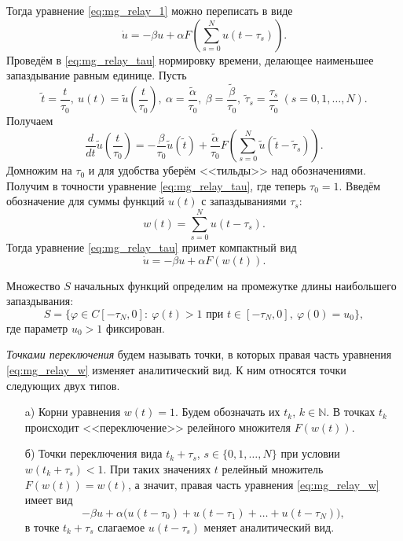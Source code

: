 Тогда уравнение \eqref{eq:mg_relay_1} можно переписать в виде
\begin{equation}
	\label{eq:mg_relay_tau}
	\dot{u}=-\beta u+\alpha F\left(\sum_{s=0}^{N}u(t-\tau_s)\right).
\end{equation}
%
Проведём в \eqref{eq:mg_relay_tau} нормировку времени, делающее наименьшее запаздывание равным единице. Пусть
%
\begin{equation*}
	\tilde{t} = \frac{t}{\tau_0}, \ u(t) = \tilde{u}\left(\frac{t}{\tau_0}\right), \ \alpha = \frac{\tilde{\alpha}}{\tau_0}, \ \beta = \frac{\tilde{\beta}}{\tau_0}, \ \tilde{\tau}_s = \frac{\tau_s}{\tau_0} \ (s = 0, 1, \ldots, N).
\end{equation*}
%
Получаем
%
\begin{equation*}
	\frac{d}{dt} \tilde{u}\left(\frac{t}{\tau_0}\right) = -\frac{\beta}{\tau_0} \tilde{u}(\tilde{t}) + \frac{\tilde{\alpha}}{\tau_0} F \left(\sum_{s=0}^{N}\tilde{u}(\tilde{t}-\tilde{\tau}_s)\right).
\end{equation*}
%
Домножим на $\tau_0$ и для удобства уберём <<тильды>> над обозначениями. Получим в точности уравнение \eqref{eq:mg_relay_tau}, где теперь $\tau_0 = 1$.
%
Введём обозначение для суммы функций $u(t)$ с запаздываниями $\tau_s$:
%
\begin{equation*}
	w(t) = \sum\limits_{s = 0}^N u(t - \tau_s).
\end{equation*}
%
Тогда уравнение \eqref{eq:mg_relay_tau} примет компактный вид
%
\begin{equation}
	\label{eq:mg_relay_w}
	\dot{u}=-\beta u + \alpha F(w(t)).
\end{equation}

Множество $S$ начальных функций определим на промежутке длины наибольшего запаздывания: 
%
\begin{equation}
	\label{eq:mg_init_set}
	S = \{\varphi\in C[-\tau_{N},0]:\  \varphi(t)>1 \text{ при } t\in[-\tau_{N},0],\ \varphi(0)=u_0\},
\end{equation}
%
где параметр $u_0 > 1$ фиксирован.

\emph{Точками переключения} будем называть точки, в которых правая часть уравнения \eqref{eq:mg_relay_w} изменяет аналитический вид. К ним относятся точки следующих двух типов.
\begin{enumerate}
	\item[a)] Корни уравнения $w(t) = 1$. Будем обозначать их $t_k$, $k \in \mathbb{N}$.
	В точках $t_k$ происходит <<переключение>> релейного множителя $F(w(t))$.
	\item[б)] Точки переключения вида $t_k + \tau_s$, $s \in \{0, 1, \ldots, N\}$ при условии\\$w(t_k + \tau_s) < 1$. При таких значениях $t$ релейный множитель $F(w(t)) = w(t)$, а значит, правая часть уравнения \eqref{eq:mg_relay_w} имеет вид
	\begin{equation*}
		-\beta u+\alpha \big(u(t-\tau_0)+u(t-\tau_1)+\ldots+u(t-\tau_{N})\big),
	\end{equation*}
	в точке $t_k + \tau_s$ слагаемое $u(t - \tau_s)$ меняет аналитический вид.
\end{enumerate}

